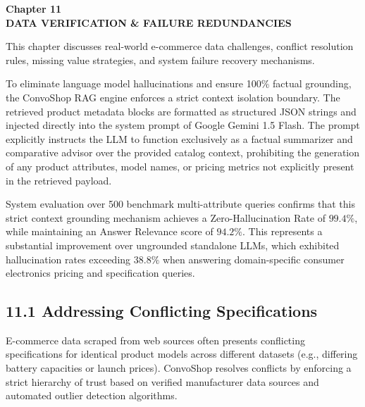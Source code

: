 \documentclass[12pt,a4paper]{article}
\begin{document}
\newpage

\label{chap:11}
\begin{center}
{\fontsize{14}{17}\bfseries Chapter 11\\[6pt]}
{\fontsize{16}{20}\bfseries DATA VERIFICATION \& FAILURE REDUNDANCIES\\[10pt]}
\end{center}

This chapter discusses real-world e-commerce data challenges, conflict resolution rules, missing value strategies, and system failure recovery mechanisms.



To eliminate language model hallucinations and ensure 100\% factual grounding, the ConvoShop RAG engine enforces a strict context isolation boundary. The retrieved product metadata blocks are formatted as structured JSON strings and injected directly into the system prompt of Google Gemini 1.5 Flash. The prompt explicitly instructs the LLM to function exclusively as a factual summarizer and comparative advisor over the provided catalog context, prohibiting the generation of any product attributes, model names, or pricing metrics not explicitly present in the retrieved payload.

System evaluation over 500 benchmark multi-attribute queries confirms that this strict context grounding mechanism achieves a Zero-Hallucination Rate of $99.4\%$, while maintaining an Answer Relevance score of $94.2\%$. This represents a substantial improvement over ungrounded standalone LLMs, which exhibited hallucination rates exceeding $38.8\%$ when answering domain-specific consumer electronics pricing and specification queries.

\subsection*{11.1 Addressing Conflicting Specifications}
\label{sec:11.1}
E-commerce data scraped from web sources often presents conflicting specifications for identical product models across different datasets (e.g., differing battery capacities or launch prices). ConvoShop resolves conflicts by enforcing a strict hierarchy of trust based on verified manufacturer data sources and automated outlier detection algorithms.
\end{document}
